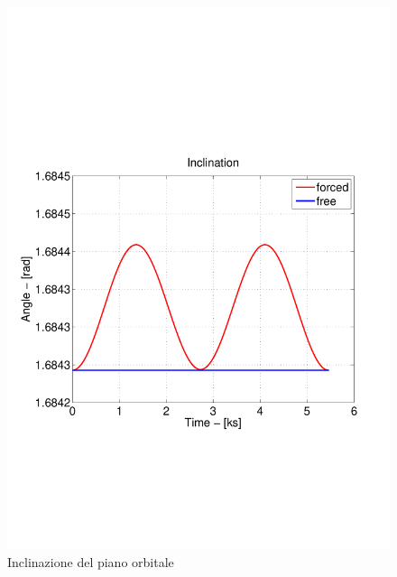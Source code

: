 \begin{figure}[h]
\begin{center}
  \includegraphics[width=\textwidth,clip=true,trim=1.5cm 6.5cm 1cm 8cm]
  {modelling/orbit_dynamics/image/inclination.pdf}
  \caption{Inclinazione del piano orbitale}
\end{center}
\end{figure}


